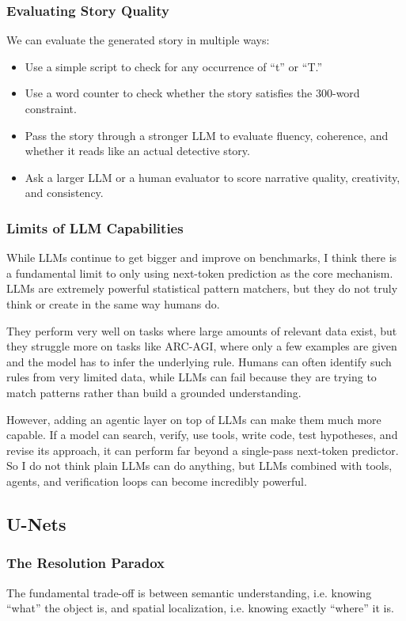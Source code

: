 \documentclass[11pt,a4paper]{article}
\begin{document}
\subsubsection{Evaluating Story Quality}
We can evaluate the generated story in multiple ways:
\begin{itemize}
    \item Use a simple script to check for any occurrence of ``t'' or ``T.''
    \item Use a word counter to check whether the story satisfies the 300-word constraint.
    \item Pass the story through a stronger LLM to evaluate fluency, coherence, and whether it reads like an actual detective story.
    \item Ask a larger LLM or a human evaluator to score narrative quality, creativity, and consistency.
\end{itemize}

\subsubsection{Limits of LLM Capabilities}
While LLMs continue to get bigger and improve on benchmarks, I think there is a fundamental limit to only using next-token prediction as the core mechanism. LLMs are extremely powerful statistical pattern matchers, but they do not truly think or create in the same way humans do.

They perform very well on tasks where large amounts of relevant data exist, but they struggle more on tasks like ARC-AGI, where only a few examples are given and the model has to infer the underlying rule. Humans can often identify such rules from very limited data, while LLMs can fail because they are trying to match patterns rather than build a grounded understanding.

However, adding an agentic layer on top of LLMs can make them much more capable. If a model can search, verify, use tools, write code, test hypotheses, and revise its approach, it can perform far beyond a single-pass next-token predictor. So I do not think plain LLMs can do anything, but LLMs combined with tools, agents, and verification loops can become incredibly powerful.

\subsection{U-Nets}

\subsubsection{The Resolution Paradox}
The fundamental trade-off is between semantic understanding, i.e. knowing ``what'' the object is, and spatial localization, i.e. knowing exactly ``where'' it is.
\end{document}
